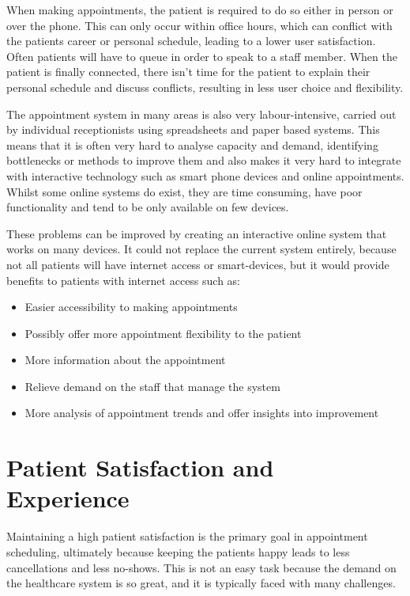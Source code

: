 When making appointments, the patient is required to do so either in person or over the phone. This can only occur within office hours, which can conflict with the patients career or personal schedule, leading to a lower user satisfaction. Often patients will have to queue in order to speak to a staff member. When the patient is finally connected, there isn't time for the patient to explain their personal schedule and discuss conflicts, resulting in less user choice and flexibility.

The appointment system in many areas is also very labour-intensive, carried out by individual receptionists using spreadsheets and paper based systems\cite{ApointProcWebsite}. This means that it is often very hard to analyse capacity and demand, identifying bottlenecks or methods to improve them and also makes it very hard to integrate with interactive technology such as smart phone devices and online appointments. Whilst some online systems do exist\cite{C&BWebsite}, they are time consuming, have poor functionality and tend to be only available on few devices\cite{C&BFailure}. 

These problems can be improved by creating an interactive online system that works on many devices. It could not replace the current system entirely, because not all patients will have internet access or smart-devices, but it would provide benefits to patients with internet access such as:

\begin{itemize}
	\item Easier accessibility to making appointments
	\item Possibly offer more appointment flexibility to the patient
	\item More information about the appointment
	\item Relieve demand on the staff that manage the system
	\item More analysis of appointment trends and offer insights into improvement
\end{itemize}

\section{Patient Satisfaction and Experience}

Maintaining a high patient satisfaction is the primary goal in appointment scheduling, ultimately because keeping the patients happy leads to less cancellations and less no-shows. This is not an easy task because the demand on the healthcare system is so great, and it is typically faced with many challenges.

